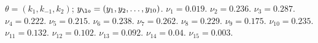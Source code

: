 \begin{algorithmic}
\Require $\theta=(k_1, k_{-1}, k_2)$; $y_{\lo} = (y_1, y_2, \dots, y_{10})$.
\State \Return $\nu_{1} = 0.019$.
\Else
\State \Return $\nu_{2} = 0.236$.
\EndIf
\Else
\State \Return $\nu_{3} = 0.287$.
\EndIf
\Else
{}
\State \Return $\nu_{4} = 0.222$.
\Else
{}
\State \Return $\nu_{5} = 0.215$.
\Else
\State \Return $\nu_{6} = 0.238$.
\EndIf
\EndIf
\Else
\State \Return $\nu_{7} = 0.262$.
\EndIf
\Else
{}
\State \Return $\nu_{8} = 0.229$.
\Else
\State \Return $\nu_{9} = 0.175$.
\EndIf
\Else
{}
\State \Return $\nu_{10} = 0.235$.
\Else
\State \Return $\nu_{11} = 0.132$.
\EndIf
\EndIf
\Else
{}
\State \Return $\nu_{12} = 0.102$.
\Else
{}
\State \Return $\nu_{13} = 0.092$.
\Else
{}
\State \Return $\nu_{14} = 0.04$.
\Else
\State \Return $\nu_{15} = 0.003$.
\EndIf
\EndIf
\EndIf
\EndIf
\EndIf
\EndIf
\end{algorithmic}
